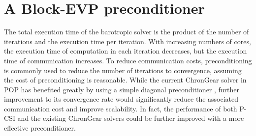 \section{A Block-EVP preconditioner} \label{se:evp}

The total
execution time of the barotropic solver is the product of the number
of iterations and the execution time per iteration.  With increasing
numbers of cores, the execution time of computation in each iteration
decreases, but the execution time of communication increases.  To
reduce communication costs, preconditioning is commonly used to reduce
the number of iterations to convergence, assuming the cost of
preconditioning is reasonable.
While the current ChronGear
solver in POP has benefited greatly by using a simple diagonal
preconditioner \cite{pini1990simple, reddy2013comparison},
further improvement to its convergence rate
would significantly reduce the associated communication cost and
improve scalability.
In fact, the performance of both P-CSI and the existing ChronGear solvers could be
further improved with a more effective preconditioner.



